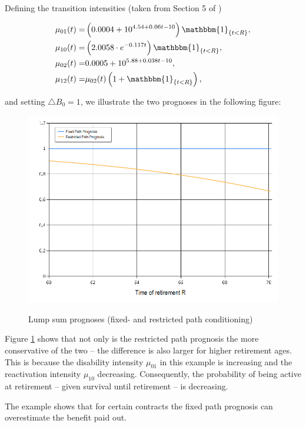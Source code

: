 \documentclass{article}
\newcommand{\1}[1]{\mathbbm{1}_{\left\lbrace #1 \right\rbrace}}
\theoremstyle{break}
\theoremstyle{remark}
\numberwithin{equation}{section}
\begin{document}
Defining the transition intensities (taken from Section 5 of \cite{BuchardtMoller})

\begin{align} \label{Intensities}
\begin{split}
		\mu_{01}(t) =& \left(0.0004 + 10^{4.54 + 0.06t - 10}\right) \1{t<R}, \\
	\mu_{10}(t) =& \left(2.0058 \cdot e^{-0.117t}\right) \1{t<R}, \\
	\mu_{02}(t) =& 0.0005 + 10^{5.88 + 0.038t - 10}, \\
	\mu_{12}(t) =& \mu_{02}(t) \left( 1 + \1{t<R} \right),
\end{split}
\end{align}

and setting $\triangle B_0=1$, we illustrate the two prognoses in the following figure:

\begin{figure}[H]
	\centering
	\caption{Lump sum prognoses (fixed- and restricted path conditioning)}
	\includegraphics[width=\textwidth]{LumpSum} \label{LumpFigure}
\end{figure}

Figure \ref{LumpFigure} shows that not only is the restricted path prognosis the more conservative of the two -- the difference is also larger for higher retirement ages. This is because the disability intensity $\mu_{01}$ in this example is increasing and the reactivation intensity $\mu_{10}$ decreasing. Consequently, the probability of being active at retirement -- given survival until retirement -- is decreasing.

The example shows that for certain contracts the fixed path prognosis can overestimate the benefit paid out.
\end{document}
